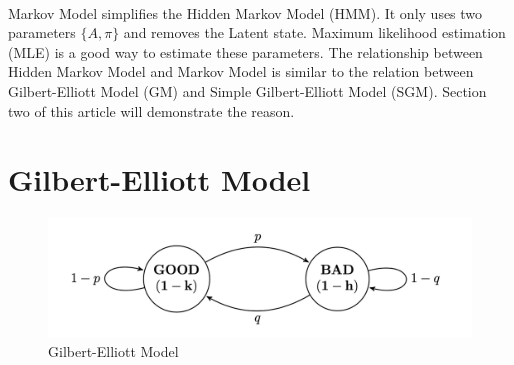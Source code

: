 \documentclass{article}
\begin{document}
    \paragraph{}
    Markov Model simplifies the Hidden Markov Model (HMM). It only uses two parameters $\{A,\pi\}$ and removes the Latent state. Maximum likelihood estimation (MLE) is a good way to 
    estimate these parameters. The relationship between Hidden Markov Model and Markov Model is similar to the relation between Gilbert-Elliott Model (GM) and Simple Gilbert-Elliott Model (SGM). Section two of this article will demonstrate the reason. 
    \section{Gilbert-Elliott Model}
    \begin{figure}[ht]
        \centering
        \includegraphics[scale=0.5]{figure1.png}
        \caption{Gilbert-Elliott Model}
        \label{fig:label}
    \end{figure}
\end{document}
